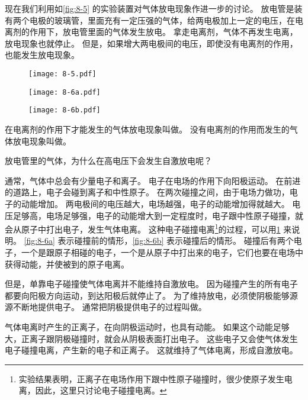 现在我们利用如\cref{fig:8-5} 的实验装置对气体放电现象作进一步的讨论。
放电管是装有两个电极的玻璃管，里面充有一定压强的气体，给两电极加上一定的电压，在电离剂的作用下，放电管里面的气体发生放电。
拿走电离剂，气体不再发生电离，放电现象也就停止。
但是，如果增大两电极间的电压，即使没有电离剂的作用，也能发生放电现象。

\begin{figure}
  \begin{minipage}[b]{0.48\linewidth}\centering
    \texttt{[image: 8-5.pdf]}
    \caption{}\label{fig:8-5}
  \end{minipage}
  \nextfloat
  \begin{minipage}[b]{0.48\linewidth}
    \begin{minipage}{0.45\linewidth}\centering
      \texttt{[image: 8-6a.pdf]}
      \subcaption{}\label{fig:8-6a}
    \end{minipage}
    \begin{minipage}{0.45\linewidth}\centering
      \texttt{[image: 8-6b.pdf]}
      \subcaption{}\label{fig:8-6b}
    \end{minipage}
    \caption{}\label{fig:8-6}
  \end{minipage}
\end{figure}

在电离剂的作用下才能发生的气体放电现象叫做。
没有电离剂的作用而发生的气体放电现象叫做。

放电管里的气体，为什么在高电压下会发生自激放电呢？

通常，气体中总会有少量电子和离子。
电子在电场的作用下向阳极运动。
在前进的道路上，电子会碰到离子和中性原子。
在两次碰撞之间，由于电场力做功，电子的动能增加。
两电极间的电压越大，电场越强，电子的动能增加得就越大。
电压足够高，电场足够强，电子的动能增大到一定程度时，电子跟中性原子碰撞，就会从原子中打出电子，发生气体电离。
这种电子碰撞电离\footnote{实验结果表明，正离子在电场作用下跟中性原子碰撞时，很少使原子发生电离，因此，这里只讨论电子碰撞电离。}的过程，可以用\cref{fig:8-6} 来说明。
\cref{fig:8-6a} 表示碰撞前的情形，\cref{fig:8-6b} 表示碰撞后的情形。
碰撞后有两个电子，一个是跟原子相碰的电子，一个是从原子中打出来的电子，它们也要在电场中获得动能，并使被到的原子电离。

但是，单靠电子碰撞使气体电离并不能维持自激放电。
因为碰撞产生的所有电子都要向阳极方向运动，到达阳极后就停止了。
为了维持放电，必须使阴极能够源源不断地提供电子。
通常把阴极提供电子的过程叫做。

气体电离时产生的正离子，在向阴极运动时，也具有动能。
如果这个动能足够大，正离子跟阴极碰撞时，就会从阴极表面打出电子。
这些电子又会使气体发生电子碰撞电离，产生新的电子和正离子。
这就维持了气体电离，形成自激放电。

